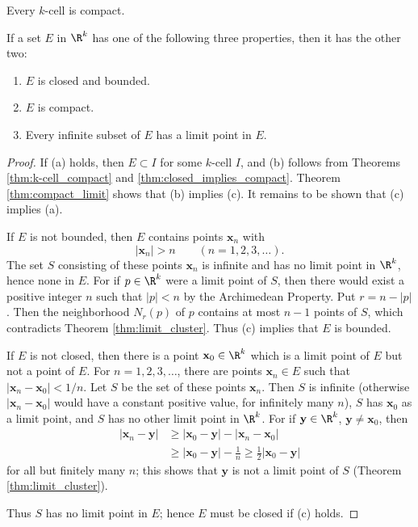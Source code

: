 \begin{theorem}\label{thm:k-cell_compact}
Every $k$-cell is compact.
\end{theorem}

\begin{theorem}
If a set $E$ in $\R^k$ has one of the following three properties, then it has the other two:
\begin{enumerate}
    \item[(a)] $E$ is closed and bounded.
    \item[(b)] $E$ is compact.
    \item[(c)] Every infinite subset of $E$ has a limit point in $E$.
\end{enumerate}
\end{theorem}
\begin{proof}
If (a) holds, then $E \subset I$ for some $k$-cell $I$, and (b) follows from Theorems \ref{thm:k-cell_compact} and \ref{thm:closed_implies_compact}.
Theorem \ref{thm:compact_limit} shows that (b) implies (c).
It remains to be shown that (c) implies (a).

If $E$ is not bounded, then $E$ contains points $\mathbf{x}_n$ with
\[
|\mathbf{x}_n|>n \qquad (n=1,2,3,\ldots).
\]
The set $S$ consisting of these points $\mathbf{x}_n$ is infinite and has no limit point in $\R^k$, hence none in $E$.
For if $p \in \R^k$ were a limit point of $S$, then there would exist a positive integer $n$ such that $|p|<n$ by the Archimedean Property.
Put $r=n-|p|$. 
Then the neighborhood $N_r(p)$ of $p$ contains at most $n-1$ points of $S$, which contradicts Theorem \ref{thm:limit_cluster}.
Thus (c) implies that $E$ is bounded.

If $E$ is not closed, then there is a point $\mathbf{x}_0 \in \R^k$ which is a limit point of $E$ but not a point of $E$.
For $n=1,2,3,\ldots$, there are points $\mathbf{x}_n \in E$ such that $|\mathbf{x}_n-\mathbf{x}_0|<1/n$.
Let $S$ be the set of these points $\mathbf{x}_n$.
Then $S$ is infinite (otherwise $|\mathbf{x}_n-\mathbf{x}_0|$ would have a constant positive value, for infinitely many $n$), $S$ has $\mathbf{x}_0$ as a limit point, and $S$ has no other limit point in $\R^k$.
For if $\mathbf{y} \in \R^k$, $\mathbf{y} \neq \mathbf{x}_0$, then
\begin{align*}
    |\mathbf{x}_n-\mathbf{y}| &\geq |\mathbf{x}_0-\mathbf{y}| - |\mathbf{x}_n-\mathbf{x}_0| \\
    &\geq |\mathbf{x}_0-\mathbf{y}| - \frac{1}{n} \geq \frac{1}{2} |\mathbf{x}_0 - \mathbf{y}|
\end{align*}
for all but finitely many $n$; this shows that $\mathbf{y}$ is not a limit point of $S$ (Theorem \ref{thm:limit_cluster}).

Thus $S$ has no limit point in $E$; hence $E$ must be closed if (c) holds.
\end{proof}

